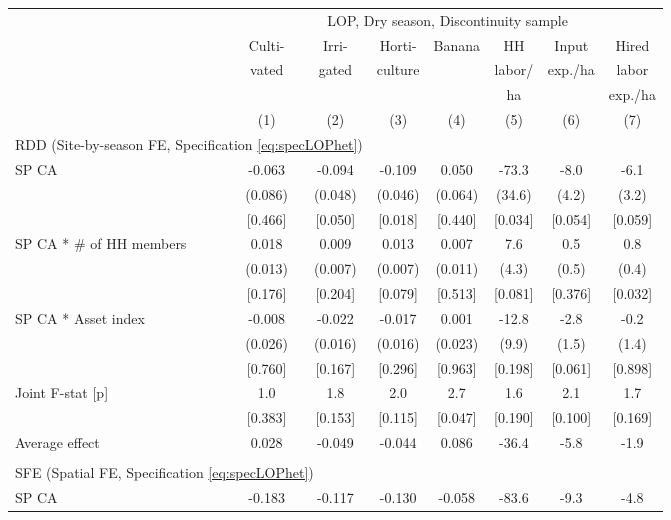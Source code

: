 \begin{tabular}{lccccccc}
\hline \hline
 & \multicolumn{7}{c}{LOP, Dry season, Discontinuity sample} \\
\cmidrule(lr){2-8}
 & Culti- & Irri- & Horti- & Banana & HH & Input & Hired \\
 & vated & gated & culture & & labor/ & exp./ha & labor \\
 & & & & & ha & & exp./ha \\
\cmidrule(lr){2-2}\cmidrule(lr){3-3}\cmidrule(lr){4-4}\cmidrule(lr){5-5}\cmidrule(lr){6-6}\cmidrule(lr){7-7}\cmidrule(lr){8-8}
 & (1) & (2) & (3) & (4) & (5) & (6) & (7) \\
\hline
\multicolumn{3}{l}{RDD (Site-by-season FE, Specification \ref{eq:specLOPhet})} & & & & & \\
\cmidrule(lr){1-3}
SP CA & -0.063\hphantom{-} & -0.094\hphantom{-} & -0.109\hphantom{-} & 0.050 & -73.3\hphantom{-} & -8.0\hphantom{-} & -6.1\hphantom{-} \\
 & (0.086) & (0.048) & (0.046) & (0.064) & (34.6) & (4.2) & (3.2) \\
 & [0.466] & [0.050] & [0.018] & [0.440] & [0.034] & [0.054] & [0.059] \\
SP CA * \# of HH members & 0.018 & 0.009 & 0.013 & 0.007 & 7.6 & 0.5 & 0.8 \\
 & (0.013) & (0.007) & (0.007) & (0.011) & (4.3) & (0.5) & (0.4) \\
 & [0.176] & [0.204] & [0.079] & [0.513] & [0.081] & [0.376] & [0.032] \\
SP CA * Asset index & -0.008\hphantom{-} & -0.022\hphantom{-} & -0.017\hphantom{-} & 0.001 & -12.8\hphantom{-} & -2.8\hphantom{-} & -0.2\hphantom{-} \\
 & (0.026) & (0.016) & (0.016) & (0.023) & (9.9) & (1.5) & (1.4) \\
 & [0.760] & [0.167] & [0.296] & [0.963] & [0.198] & [0.061] & [0.898] \\
Joint F-stat [p] & 1.0 & 1.8 & 2.0 & 2.7 & 1.6 & 2.1 & 1.7 \\
 & [0.383] & [0.153] & [0.115] & [0.047] & [0.190] & [0.100] & [0.169] \\
\cmidrule(lr){1-8}
Average effect & 0.028 & -0.049 & -0.044 & 0.086 & -36.4 & -5.8 & -1.9 \\
\cmidrule(lr){1-8}
\\[-0.5em]
\multicolumn{3}{l}{SFE (Spatial FE, Specification \ref{eq:specLOPhet})} & & & & & \\
\cmidrule(lr){1-3}
SP CA & -0.183\hphantom{-} & -0.117\hphantom{-} & -0.130\hphantom{-} & -0.058\hphantom{-} & -83.6\hphantom{-} & -9.3\hphantom{-} & -4.8\hphantom{-} \\

\end{tabular}
